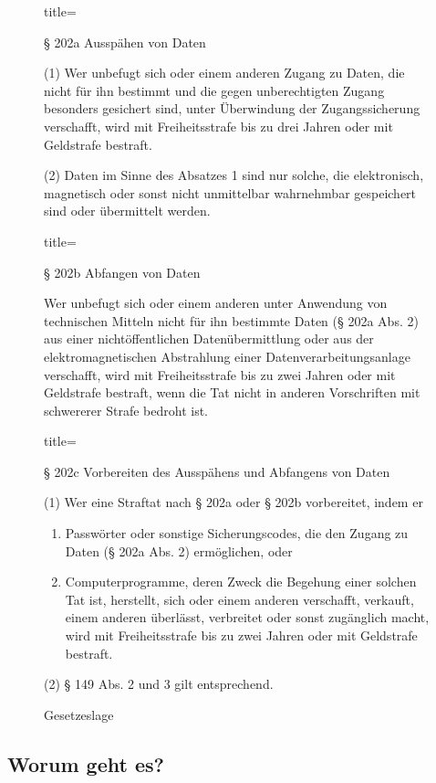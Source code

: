 \documentclass[ngerman]{scrartcl}
\begin{document}
\begin{figure}[p]
\begin{anmerkung}{title={§ 202a Ausspähen von Daten\par}}
(1) Wer unbefugt sich oder einem anderen Zugang zu Daten, die nicht für ihn bestimmt und die gegen unberechtigten Zugang besonders gesichert sind, unter Überwindung der Zugangssicherung verschafft, wird mit Freiheitsstrafe bis zu drei Jahren oder mit Geldstrafe bestraft.

\vspace{0.5\baselineskip}

(2) Daten im Sinne des Absatzes 1 sind nur solche, die elektronisch, magnetisch oder sonst nicht unmittelbar wahrnehmbar gespeichert sind oder übermittelt werden.
\end{anmerkung}

\begin{anmerkung}{title={§ 202b Abfangen von Daten\par}}
Wer unbefugt sich oder einem anderen unter Anwendung von technischen Mitteln nicht für ihn bestimmte Daten (§ 202a Abs. 2) aus einer nichtöffentlichen Datenübermittlung oder aus der elektromagnetischen Abstrahlung einer Datenverarbeitungsanlage verschafft, wird mit Freiheitsstrafe bis zu zwei Jahren oder mit Geldstrafe bestraft, wenn die Tat nicht in anderen Vorschriften mit schwererer Strafe bedroht ist.
\end{anmerkung}

\begin{anmerkung}{title={§ 202c Vorbereiten des Ausspähens und Abfangens von Daten\par}}
(1) Wer eine Straftat nach § 202a oder § 202b vorbereitet, indem er
\begin{enumerate}
  \item Passwörter oder sonstige Sicherungscodes, die den Zugang zu Daten (§ 202a Abs. 2) ermöglichen, oder
\item Computerprogramme, deren Zweck die Begehung einer solchen Tat ist,
herstellt, sich oder einem anderen verschafft, verkauft, einem anderen überlässt, verbreitet oder sonst zugänglich macht, wird mit Freiheitsstrafe bis zu zwei Jahren oder mit Geldstrafe bestraft.
\end{enumerate}
(2) § 149 Abs. 2 und 3 gilt entsprechend.
\end{anmerkung}
\caption{Gesetzeslage}\label{fig:gesetzeslage}
\end{figure}

\subsection{Worum geht es?}
\end{document}
